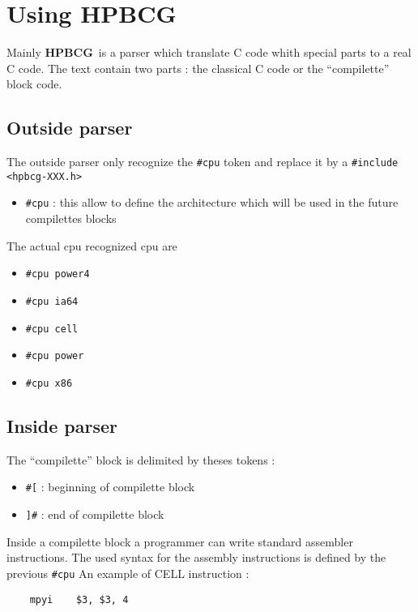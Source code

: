 \documentclass{article}
\newcommand{\hpbcg}{\textbf{HPBCG}\ }
\begin{document}
\section{Using \hpbcg}

Mainly \hpbcg is a parser which translate C code whith special parts
to a real C code. The text contain two parts : the classical C code or
the ``compilette'' block code.

\subsection{Outside parser}

The outside parser only recognize the \verb|#cpu| token and replace it
by a \verb|#include <hpbcg-XXX.h>|


\begin{itemize}
\item \verb|#cpu| : this allow to define the architecture which will be
  used in the future compilettes blocks
\end{itemize}

The actual cpu recognized cpu are 
\begin{itemize}
\item \verb|#cpu power4|
\item \verb|#cpu ia64|
\item \verb|#cpu cell|
\item \verb|#cpu power|
\item \verb|#cpu x86|
\end{itemize}

\subsection{Inside parser}

The ``compilette'' block is delimited by theses tokens :  

\begin{itemize}
\item \verb|#[| : beginning of compilette block
\item \verb|]#| : end of compilette block
\end{itemize}

Inside a compilette block a programmer can write standard assembler
instructions. The used syntax for the assembly instructions is defined
by the previous \verb|#cpu| An example of CELL instruction :

\begin{verbatim}
	mpyi    $3, $3, 4
\end{verbatim}
\end{document}
